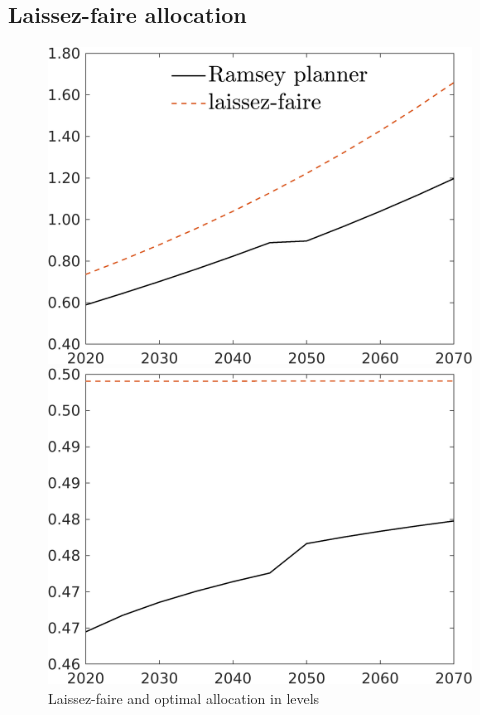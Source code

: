 \subsection{Laissez-faire allocation}
\begin{figure}[h!!]
	\centering
	\caption{Laissez-faire and optimal allocation in levels }\label{fig:LF}
	\begin{minipage}[]{0.32\textwidth}
		\includegraphics[width=1\textwidth]{../../codding_model/own_basedOnFried/optimalPol_190722_tidiedUp/figures/all_10Aout22/C_LFCompOPT_T_NoTaus_regime3_spillover0_noskill0_sep1_xgrowth0_etaa0.79_lgd1.png}
	\end{minipage}
	\begin{minipage}[]{0.32\textwidth}
	\includegraphics[width=1\textwidth]{../../codding_model/own_basedOnFried/optimalPol_190722_tidiedUp/figures/all_10Aout22/hh_LFCompOPT_T_NoTaus_regime3_spillover0_noskill0_sep1_xgrowth0_etaa0.79_lgd0.png}

\end{minipage}
\end{figure}
